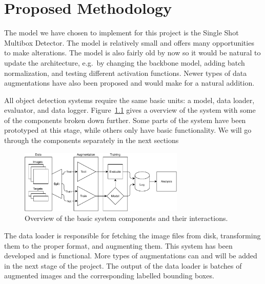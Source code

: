 \chapter{Proposed Methodology}\label{cha:method}

The model we have chosen to implement for this project is the Single Shot Multibox Detector.
The model is relatively small and offers many opportunities to make alterations.
The model is also fairly old by now so it would be natural to update the architecture, e.g.~by changing the backbone model, adding batch normalization, and testing different activation functions.
Newer types of data augmentations have also been proposed and would make for a natural addition.

All object detection systems require the same basic units: a model, data loader, evaluator, and data logger.
Figure~\ref{fig:sys} gives a overview of the system with some of the components broken down further.
Some parts of the system have been prototyped at this stage, while others only have basic functionality.
We will go through the components separately in the next sections

\begin{figure}[htb]
  \centering
  \includegraphics[width=0.7\textwidth]{figs/system.pdf}
  \caption[System overview]{Overview of the basic system components and their interactions.}\label{fig:sys}
\end{figure}

The data loader is responsible for fetching the image files from disk, transforming them to the proper format, and augmenting them.
This system has been developed and is functional.
More types of augmentations can and will be added in the next stage of the project.
The output of the data loader is batches of augmented images and the corresponding labelled bounding boxes.


